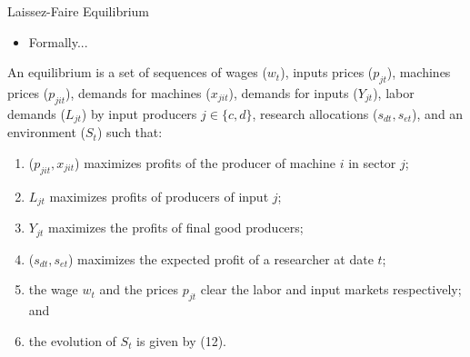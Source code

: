 \documentclass[aspectratio=169,xcolor=dvipsnames]{beamer}
\begin{document}
\begin{frame}{Laissez-Faire Equilibrium}
    \begin{itemize}
        \item Formally...
    \end{itemize}
    \begin{definition}
    An equilibrium is a set of sequences of wages ($w_t$), inputs prices ($p_{jt}$), machines prices ($p_{jit}$), demands for machines ($x_{jit}$), demands for inputs ($Y_{jt}$), labor demands ($L_{jt}$) by input producers $j \in \{c, d\}$, research allocations ($s_{dt}, s_{et}$), and an environment ($S_t$) such that:
\begin{enumerate}
    \item[(i)] ($p_{jit}, x_{jit}$) maximizes profits of the producer of machine $i$ in sector $j$;
    \item[(ii)] $L_{jt}$ maximizes profits of producers of input $j$;
    \item[(iii)] $Y_{jt}$ maximizes the profits of final good producers;
    \item[(iv)] ($s_{dt}, s_{et}$) maximizes the expected profit of a researcher at date $t$;
    \item[(v)] the wage $w_t$ and the prices $p_{jt}$ clear the labor and input markets respectively; and
    \item[(vi)] the evolution of $S_t$ is given by (12).
\end{enumerate}
    \end{definition}
\end{frame}
\end{document}
